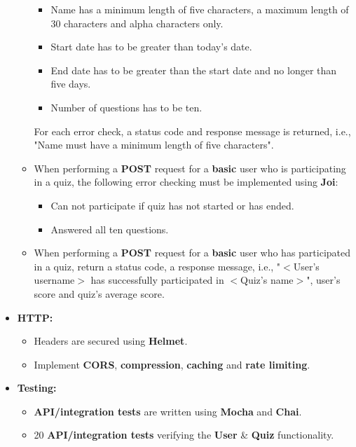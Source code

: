 \documentclass{article}
\begin{document}
\begin{itemize}
\begin{itemize}
		\begin{itemize}
			\item Name has a minimum length of five characters, a maximum length of 30 characters and alpha characters only.
			\item Start date has to be greater than today's date.
			\item End date has to be greater than the start date and no longer than five days. 
			\item Number of questions has to be ten.
		\end{itemize}
		For each error check, a status code and response message is returned, i.e., "Name must have a minimum length of five characters".
		\item When performing a \textbf{POST} request for a \textbf{basic} user who is participating in a quiz, the following error checking must be implemented using \textbf{Joi}:
		\begin{itemize}
			\item Can not participate if quiz has not started or has ended.
			\item Answered all ten questions.
		\end{itemize}
		\item When performing a \textbf{POST} request for a \textbf{basic} user who has participated in a quiz, return a status code, a response message, i.e., "$<$User's username$>$ has successfully participated in $<$Quiz's name$>$", user's score and quiz's average score.
	\end{itemize}
	
	\item \textbf{HTTP:}
	\begin{itemize}
		\item Headers are secured using \textbf{Helmet}.
		\item Implement \textbf{CORS}, \textbf{compression}, \textbf{caching} and \textbf{rate limiting}.
	\end{itemize}
	
	\item \textbf{Testing:}
	\begin{itemize}
		\item \textbf{API/integration tests} are written using \textbf{Mocha} and \textbf{Chai}.
		\item 20 \textbf{API/integration tests} verifying the \textbf{User} \& \textbf{Quiz} functionality.
	\end{itemize}


\end{itemize}
\end{document}
